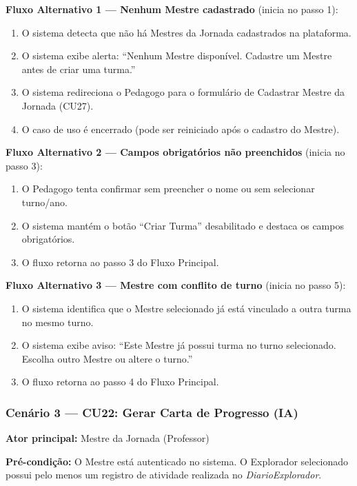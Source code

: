 \documentclass[12pt, a4paper]{article}
\begin{document}
\textbf{Fluxo Alternativo 1 --- Nenhum Mestre cadastrado} (inicia no passo 1):
\begin{enumerate}
    \item O sistema detecta que não há Mestres da Jornada cadastrados na plataforma.
    \item O sistema exibe alerta: ``Nenhum Mestre disponível. Cadastre um Mestre antes de criar uma turma.''
    \item O sistema redireciona o Pedagogo para o formulário de Cadastrar Mestre da Jornada (CU27).
    \item O caso de uso é encerrado (pode ser reiniciado após o cadastro do Mestre).
\end{enumerate}

\textbf{Fluxo Alternativo 2 --- Campos obrigatórios não preenchidos} (inicia no passo 3):
\begin{enumerate}
    \item O Pedagogo tenta confirmar sem preencher o nome ou sem selecionar turno/ano.
    \item O sistema mantém o botão ``Criar Turma'' desabilitado e destaca os campos obrigatórios.
    \item O fluxo retorna ao passo 3 do Fluxo Principal.
\end{enumerate}

\textbf{Fluxo Alternativo 3 --- Mestre com conflito de turno} (inicia no passo 5):
\begin{enumerate}
    \item O sistema identifica que o Mestre selecionado já está vinculado a outra turma no mesmo turno.
    \item O sistema exibe aviso: ``Este Mestre já possui turma no turno selecionado. Escolha outro Mestre ou altere o turno.''
    \item O fluxo retorna ao passo 4 do Fluxo Principal.
\end{enumerate}

\bigskip

\subsubsection*{Cenário 3 --- CU22: Gerar Carta de Progresso (IA)}

\noindent\textbf{Ator principal:} Mestre da Jornada (Professor)

\noindent\textbf{Pré-condição:} O Mestre está autenticado no sistema. O Explorador
selecionado possui pelo menos um registro de atividade realizada no
\textit{DiarioExplorador}.
\end{document}
